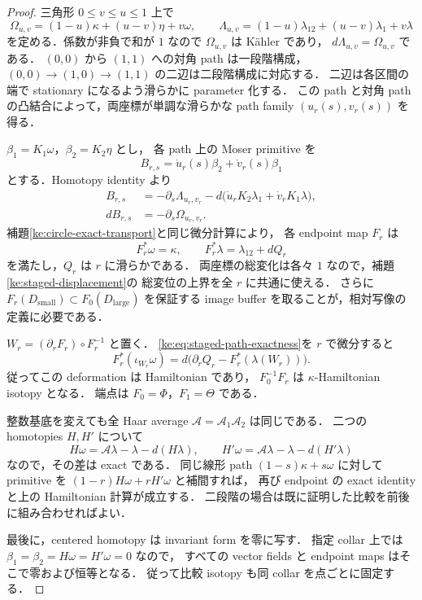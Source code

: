 \begin{proof}
三角形 $0\le v\le u\le1$ 上で
\[
 \Omega_{u,v}=(1-u)\kappa+(u-v)\eta+v\omega,\qquad
 \Lambda_{u,v}=(1-u)\lambda_{12}+(u-v)\lambda_1+v\lambda
\]
を定める．係数が非負で和が $1$ なので $\Omega_{u,v}$ は K\"ahler であり，
$d\Lambda_{u,v}=\Omega_{u,v}$ である．
$(0,0)$ から $(1,1)$ への対角 path は一段階構成，
$(0,0)\to(1,0)\to(1,1)$ の二辺は二段階構成に対応する．
二辺は各区間の端で stationary になるよう滑らかに parameter 化する．
この path と対角 path の凸結合によって，両座標が単調な滑らかな path family
$(u_r(s),v_r(s))$ を得る．

$\beta_1=K_1\omega$，$\beta_2=K_2\eta$ とし，
各 path 上の Moser primitive を
\[
 B_{r,s}=\dot u_r(s)\beta_2+\dot v_r(s)\beta_1
\]
とする．Homotopy identity より
\begin{align*}
 B_{r,s}
 &=-\partial_s\Lambda_{u_r,v_r}
       -d\bigl(\dot u_r K_2\lambda_1+\dot v_rK_1\lambda\bigr),\\
 dB_{r,s}&=-\partial_s\Omega_{u_r,v_r}.
\end{align*}
補題\ref{ke:circle-exact-transport}と同じ微分計算により，
各 endpoint map $F_r$ は
\begin{equation}\label{ke:eq:staged-path-exactness}
 F_r^*\omega=\kappa,\qquad F_r^*\lambda=\lambda_{12}+dQ_r
\end{equation}
を満たし，$Q_r$ は $r$ に滑らかである．
両座標の総変化は各々 $1$ なので，補題\ref{ke:staged-displacement}の
総変位の上界を全 $r$ に共通に使える．
さらに $F_r(D_{\mathrm{small}})\subset F_0(D_{\mathrm{large}})$ を保証する
image buffer を取ることが，相対写像の定義に必要である．

$W_r=(\partial_rF_r)\circ F_r^{-1}$ と置く．
\eqref{ke:eq:staged-path-exactness}を $r$ で微分すると
\[
 F_r^*(\iota_{W_r}\omega)
 =d\bigl(\partial_rQ_r-F_r^*(\lambda(W_r))\bigr).
\]
従ってこの deformation は Hamiltonian であり，
$F_0^{-1}F_r$ は $\kappa$-Hamiltonian isotopy となる．
端点は $F_0=\Phi$，$F_1=\Theta$ である．

整数基底を変えても全 Haar average $\mathcal A=\mathcal A_1\mathcal A_2$ は同じである．
二つの homotopies $H,H'$ について
\[
 H\omega=\mathcal A\lambda-\lambda-d(H\lambda),\qquad
 H'\omega=\mathcal A\lambda-\lambda-d(H'\lambda)
\]
なので，その差は exact である．
同じ線形 path $(1-s)\kappa+s\omega$ に対して primitive を
$(1-r)H\omega+rH'\omega$ と補間すれば，
再び endpoint の exact identity と上の Hamiltonian 計算が成立する．
二段階の場合は既に証明した比較を前後に組み合わせればよい．

最後に，centered homotopy は invariant form を零に写す．
指定 collar 上では $\beta_1=\beta_2=H\omega=H'\omega=0$ なので，
すべての vector fields と endpoint maps はそこで零および恒等となる．
従って比較 isotopy も同 collar を点ごとに固定する．
\end{proof}

